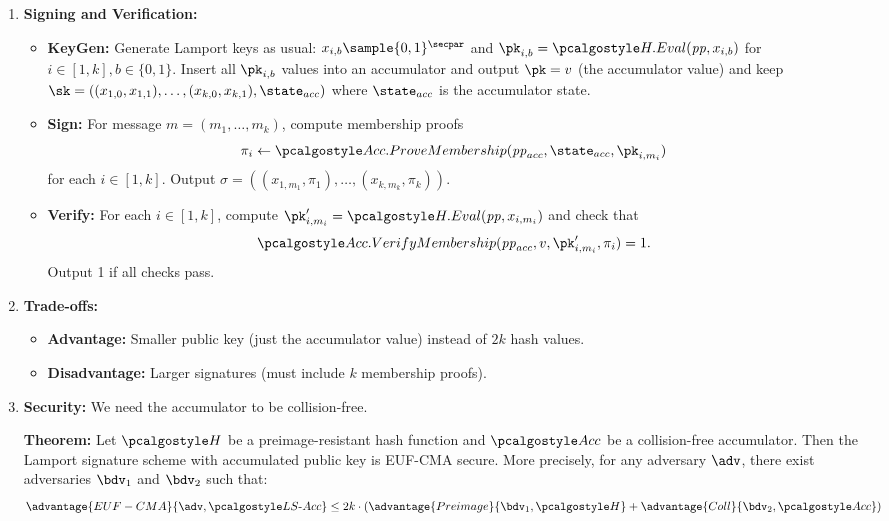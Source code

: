 \ifsolutions
\begin{mysolution}
  \begin{enumerate}
    \item \textbf{Signing and Verification:}
    \begin{itemize}
      \item \textbf{KeyGen:} Generate Lamport keys as usual: $x_{i,b} \sample \{0,1\}^\secpar$ and $\pk_{i,b} = \algo{H.Eval}(\params, x_{i,b})$ for $i \in [1,k], b \in \{0,1\}$.
      Insert all $\pk_{i,b}$ values into an accumulator and output $\pk = v$ (the accumulator value) and keep $\sk = ((x_{1,0}, x_{1,1}), \ldots, (x_{k,0}, x_{k,1}), \state_{acc})$ where $\state_{acc}$ is the accumulator state.
    \item \textbf{Sign:} For message $m = (m_1, \ldots, m_k)$, compute membership proofs
      \[
        \pi_i \gets \algo{Acc.ProveMembership}(\params_{acc}, \state_{acc}, \pk_{i,m_i})
      \]
      for each $i \in [1,k]$.
      Output $\sigma = ((x_{1,m_1}, \pi_1), \ldots, (x_{k,m_k}, \pi_k))$.
    \item \textbf{Verify:} For each $i \in [1,k]$, compute $\pk'_{i,m_i} = \algo{H.Eval}(\params, x_{i,m_i})$ and check that
      \[
      \algo{Acc.VerifyMembership}(\params_{acc}, v, \pk'_{i,m_i}, \pi_i) = 1.
      \]
      Output 1 if all checks pass.
    \end{itemize}
    
    \item \textbf{Trade-offs:}
    \begin{itemize}
      \item \textbf{Advantage:} Smaller public key (just the accumulator value) instead of $2k$ hash values.
      \item \textbf{Disadvantage:} Larger signatures (must include $k$ membership proofs).
    \end{itemize}
    
    \item \textbf{Security:}
    We need the accumulator to be collision-free.
    
    \textbf{Theorem:} Let $\algo{H}$ be a preimage-resistant hash function and $\algo{Acc}$ be a collision-free accumulator.
    Then the Lamport signature scheme with accumulated public key is EUF-CMA secure.
    More precisely, for any \ppt adversary $\adv$, there exist \ppt adversaries $\bdv_1$ and $\bdv_2$ such that:
    \[
      \advantage{EUF-CMA}{\adv, \algo{LS\text{-}Acc}} \leq 2k \cdot (\advantage{Preimage}{\bdv_1, \algo{H}} + \advantage{Coll}{\bdv_2, \algo{Acc}})
    \]
    

\end{enumerate}
\end{mysolution}
